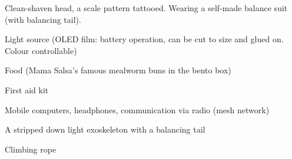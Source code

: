 \newpage
\begin{npcBox}[title=Curly continued]
    \begin{npcDescription}
    Clean-shaven head, a scale pattern tattooed. Wearing a self-made balance suit (with balancing tail).        
    \end{npcDescription}


    \begin{equipment}
    \item Light source (OLED film: battery operation, can be cut to size and glued on. Colour controllable)
    \item Food (Mama Salsa's famous mealworm buns in the bento box)
    \item First aid kit
    \item Mobile computers, headphones, communication via radio (mesh network)
    \item A stripped down light exoskeleton with a balancing tail
    \item Climbing rope
    \end{equipment}
\end{npcBox}




